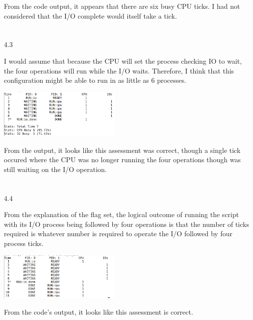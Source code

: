 \documentclass[12pt, a4paper]{article}
\begin{document}
	From the code output, it appears that there are six busy CPU ticks. I had not considered that the I/O complete would itself take a tick. \\ \\ \\
	
4.3

	I would assume that because the CPU will set the process checking IO to wait, the four operations will run while the I/O waits. Therefore, I think that this configuration might be able to run in as little as 6 processes. \\
	\begin{center}
	\includegraphics[width=6cm]{hw1_4_3.png}\\
	\end{center}
	
	From the output, it looks like this assessment was correct, though a single tick occured where the CPU was no longer running the four operations though was still waiting on the I/O operation. \\ \\ \\

4.4

	From the explanation of the flag set, the logical outcome of running the script with its I/O process being followed by four operations is that the number of ticks required is whatever number is required to operate the I/O followed by four process ticks.\\
	
	\begin{center}
	\includegraphics[width=6cm]{hw1_4_4.png}\\
	\end{center}
	
	From the code's output, it looks like this assessment is correct. \\ \\ \\
	
\end{document}
